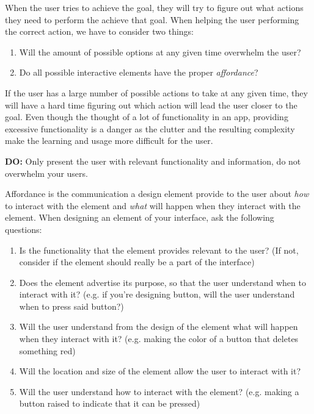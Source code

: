 When the user tries to achieve the goal, they will try to figure out what actions they need to perform the achieve that goal. When helping the user performing the correct action, we have to consider two things:

\begin{enumerate}
  \item Will the amount of possible options at any given time overwhelm the user?
  \item Do all possible interactive elements have the proper \textit{affordance}?
\end{enumerate}

If the user has a large number of possible actions to take at any given time, they will have a hard time figuring out which action will lead the user closer to the goal. Even though the thought of a lot of functionality in an app, providing excessive functionality is a danger as the clutter and the resulting complexity make the learning and usage more difficult for the user.

\begin{displayquote}
  \textbf{DO:} Only present the user with relevant functionality and information, do not overwhelm your users.
\end{displayquote}

Affordance is the communication a design element provide to the user about \textit{how} to interact with the element and \textit{what} will happen when they interact with the element. When designing an element of your interface, ask the following questions:

\begin{enumerate}
  \item Is the functionality that the element provides relevant to the user? (If not, consider if the element should really be a part of the interface)
  \item Does the element advertise its purpose, so that the user understand when to interact with it? (e.g. if you're designing button, will the user understand when to press said button?)
  \item Will the user understand from the design of the element what will happen when they interact with it? (e.g. making the color of a button that deletes something red)
  \item Will the location and size of the element allow the user to interact with it?
  \item Will the user understand how to interact with the element? (e.g. making a button raised to indicate that it can be pressed)
\end{enumerate}

